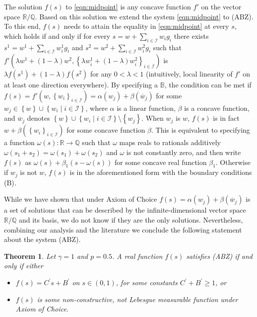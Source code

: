 \documentclass{article}
\newtheorem{theorem}{Theorem}
\theoremstyle{named}
\newcommand{\RR}{\mathbb{R}}
\newcommand{\QQ}{\mathbb{Q}}
\newcommand{\BB}{\mathbb{B}}
\newcommand{\cI}{\mathcal{I}}
\newcommand{\set}[1]{\left\{#1\right\}}
\begin{document}
The solution $f(s)$ to \eqref{eqn:midpoint} is any concave function $f'$ on the vector space $\RR/\QQ$. Based on this solution we extend the system \eqref{eqn:midpoint} to (ABZ). To this end, $f(s)$ needs to attain the equality in \eqref{eqn:midpoint} at every $s$, which holds if and only if for every $s=w+\sum_{i\in\cI} w_ig_i$ there exists $s^1=w^1+\sum_{i\in\cI} w_i^1g_i$ and $s^2=w^2+\sum_{i\in\cI} w_i^2g_i$ such that $f'(\lambda w^1+(1-\lambda)w^2, \set{\lambda w_i^1+(1-\lambda)w_i^2}_{i\in \cI})$ is $\lambda f(s^1) + (1-\lambda)f(s^2)$ for any $0<\lambda<1$ (intuitively, local linearity of $f'$ on at least one direction everywhere). 
By specifying a $\BB$, the condition can be met if $f(s)=f'(w, \set{w_i}_{i\in \cI})=\alpha(w_j) + \beta({\overline w}_j)$ for some $w_j\in \set{w}\cup\set{w_i\mid i\in\cI}$, where $\alpha$ is a linear function, $\beta$ is a concave function, and ${\overline w}_j$ denotes $\set{w}\cup\set{w_i\mid i\in\cI}\setminus \set{w_j}$. When $w_j$ is $w$, $f(s)$ is in fact $w+\beta(\set{w_i}_{i\in\cI})$ for some concave function $\beta$. This is equivalent to specifying a function $\omega(s):\RR\to\QQ$ such that $\omega$ maps reals to rationals additively $\omega(s_1+s_2)=\omega(s_1)+\omega(s_2)$ and $\omega$ is not constantly zero, and then write $f(s)$ as $\omega(s)+\beta_1(s-\omega(s))$ for some concave real function $\beta_1$. Otherwise if $w_j$ is not $w$, $f(s)$ is in the aforementioned form with the boundary conditions (B).





While we have shown that under Axiom of Choice $f(s)=\alpha(w_j) + \beta(\overline{w}_j)$ is a set of solutions that can be described by the infinite-dimensional vector space $\RR/\QQ$ and its basis, we do not know if they are the only solutions. Nevertheless, combining our analysis and the literature we conclude the following statement about the system (ABZ).

\begin{theorem}
\label{thm:negativef}
Let $\gamma=1$ and $p=0.5$. A real function $f(s)$ satisfies ({ABZ}) if and only if either
\begin{itemize}\vspace{-1.0mm}
\item $f(s)=C^\prime s+B^\prime$ on $s\in (0,1)$, for some constants $C^\prime+B^\prime \geq 1$, or
\item $f(s)$ is some non-constructive, not Lebesgue measurable function under Axiom of Choice.
\end{itemize}
\end{theorem}
\end{document}

